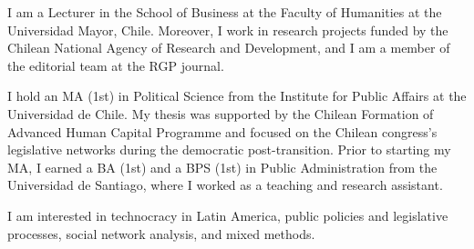 




\par{I am a Lecturer in the School of Business at the Faculty of Humanities at the Universidad Mayor, Chile. Moreover, I work in research projects funded by the Chilean National Agency of Research and Development, and I am a member of the editorial team at the RGP journal. 

I hold an MA (1st) in Political Science from the Institute for Public Affairs at the Universidad de Chile. My thesis was supported by the Chilean Formation of Advanced Human Capital Programme and focused on the Chilean congress's legislative networks during the democratic post-transition. Prior to starting my MA, I earned a BA (1st) and a BPS (1st) in Public Administration from the Universidad de Santiago, where I worked as a teaching and research assistant.

I am interested in technocracy in Latin America, public policies and legislative processes, social network analysis, and mixed methods.}\\